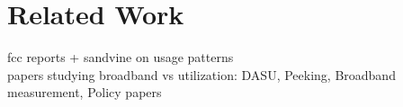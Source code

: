 \section{Related Work}
\label{related}
fcc reports + sandvine on usage patterns\\
papers studying broadband vs utilization:
DASU, Peeking, Broadband measurement, Policy papers\\
